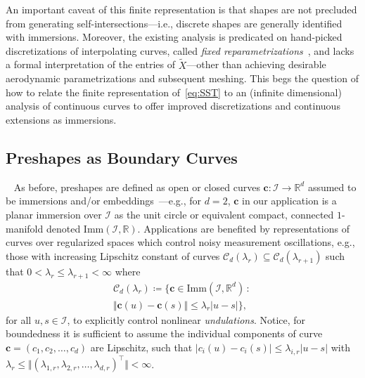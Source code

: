 \documentclass[pdflatex,iicol]{sn-jnl}%
\theoremstyle{thmstyleone}%
\theoremstyle{thmstyletwo}%
\theoremstyle{thmstylethree}%
\begin{document}
An important caveat of this finite representation is that shapes are not precluded from generating self-intersections---i.e., discrete shapes are generally identified with immersions. Moreover, the existing analysis is predicated on hand-picked discretizations of interpolating curves, called \emph{fixed reparametrizations}~\cite{grey2023separable}, and lacks a formal interpretation of the entries of $\widetilde{X}$---other than achieving desirable aerodynamic parametrizations and subsequent meshing. This begs the question of how to relate the finite representation of~\eqref{eq:SST} to an (infinite dimensional) analysis of continuous curves to offer improved discretizations and continuous extensions as immersions.

\subsection{Preshapes as Boundary Curves}~\label{subsec:preshapes}
As before, preshapes are defined as open or closed curves $\boldsymbol{c}:\mathcal{I} \rightarrow \mathbb{R}^d$ assumed to be immersions and/or embeddings~\cite{micheli2013matrix,bauer2014overview,srivastava2010shape,mumford2006riemannian,younes2008metric,hartman2023elastic}---e.g., for $d=2$, $\boldsymbol{c}$ in our application is a planar immersion over $\mathcal{I}$ as the unit circle or equivalent compact, connected $1$-manifold denoted $\text{Imm}(\mathcal{I}, \mathbb{R})$. Applications are benefited by representations of curves over regularized spaces which control noisy measurement oscillations, e.g., those with increasing Lipschitz constant of curves $\mathcal{C}_d(\lambda_r) \subseteq \mathcal{C}_d(\lambda_{r+1})$ such that $0<\lambda_r \leq \lambda_{r+1}<\infty$ where
        \begin{multline}\label{eq:reg_Hilbert_space}
             \mathcal{C}_d(\lambda_r) \coloneqq
             \lbrace \boldsymbol{c} \in \text{Imm}(\mathcal{I},\mathbb{R}^d) \,:\,\\ \Vert \boldsymbol{c}(u) - \boldsymbol{c}(s)\Vert \leq \lambda_r\vert u - s\vert\rbrace,
        \end{multline}
for all $u,s\in \mathcal{I}$, to explicitly control nonlinear \emph{undulations}. Notice, for boundedness it is sufficient to assume the individual components of curve $\boldsymbol{c} = (c_1, c_2, \dots, c_d)$ are Lipschitz, such that $\vert c_i(u) - c_i(s) \vert \leq \lambda_{i,r}\vert u - s\vert$ with $\lambda_r \leq \Vert (\lambda_{1,r}, \lambda_{2,r},\dots, \lambda_{d,r})^\top\Vert <\infty$.
\end{document}
